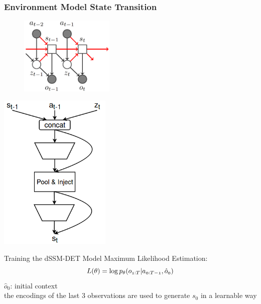 \begin{frame}
	\frametitle{Environment Model State Transition}
	\begin{multicols}{2}
		\begin{figure}[h]
			\includegraphics[width=0.4\textwidth]{./latent_i2a_images/sSSM2_state_transition_marked.png}	
		\end{figure}
		\columnbreak
		\includegraphics[width=0.4\textwidth]{./latent_i2a_images/LatentSpaceTransition.png}
	\end{multicols}
\end{frame}


\begin{frame}{Training the dSSM-DET Model}
    Maximum Likelihood Estimation:
    \begin{equation}
    \mathnormal{
            L(\theta) = \log p_{\theta}(o_{1:T}|a_{0:T-1}, \hat{o}_0)}
    \end{equation}
        $\hat{o}_0$: initial context\\
        the encodings of the last 3 observations are used to generate $s_0$ in a learnable way
    
\end{frame}

